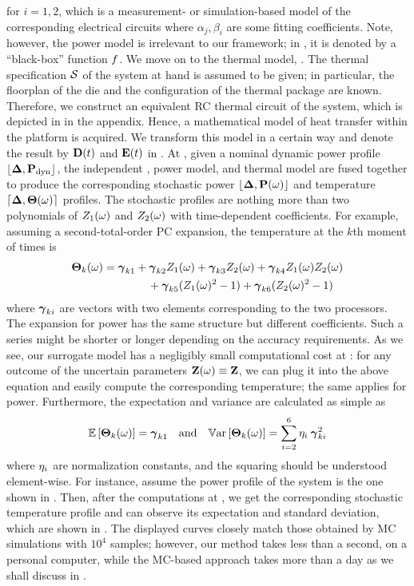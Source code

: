 for $i = 1, 2$, which is a measurement- or simulation-based model of the corresponding electrical circuits where $\alpha_j, \beta_i$ are some fitting coefficients. Note, however, the power model is irrelevant to our framework; in , it is denoted by a ``black-box'' function $f$. We move on to the thermal model, . The thermal specification $\mathcal{S}$ of the system at hand is assumed to be given; in particular, the floorplan of the die and the configuration of the thermal package are known. Therefore, we construct an equivalent RC thermal circuit of the system, which is depicted in  in the appendix. Hence, a mathematical model of heat transfer within the platform is acquired. We transform this model in a certain way and denote the result by $\mCF(\t)$ and $\mCS(\t)$ in . At , given a nominal dynamic power profile $\profPdyn$, the independent \rvs, power model, and thermal model are fused together to produce the corresponding stochastic power $\profP{\o}$ and temperature $\profT{\o}$ profiles. The stochastic profiles are nothing more than two polynomials of $Z_1(\omega)$ and $Z_2(\omega)$ with time-dependent coefficients. For example, assuming a second-total-order PC expansion, the temperature at the $k$th moment of times is
\begin{align*}
  {\boldsymbol\Theta}_k(\omega) &= {\boldsymbol\gamma}_{k1} + {\boldsymbol\gamma}_{k2} Z_1(\omega) + {\boldsymbol\gamma}_{k3} Z_2(\omega) + {\boldsymbol\gamma}_{k4} Z_1(\omega) Z_2(\omega) \\
  & \qquad \qquad {} + {\boldsymbol\gamma}_{k5} (Z_1(\omega)^2 - 1) + {\boldsymbol\gamma}_{k6} (Z_2(\omega)^2 - 1)
\end{align*}
where ${\boldsymbol\gamma}_{ki}$ are vectors with two elements corresponding to the two processors. The expansion for power has the same structure but different coefficients. Such a series might be shorter or longer depending on the accuracy requirements. As we see, our surrogate model has a negligibly small computational cost at : for any outcome of the uncertain parameters $\mathbf{Z}(\omega) \equiv \mathbf{Z}$, we can plug it into the above equation and easily compute the corresponding temperature; the same applies for power. Furthermore, the expectation and variance are calculated as simple as
\[
  \mathbb{E}\left[{\boldsymbol\Theta}_k(\omega)\right] = {\boldsymbol\gamma}_{k1} \hspace{1em} \text{and} \hspace{1em} \mathbb{V}\text{ar}\left[{\boldsymbol\Theta}_k(\omega)\right] = \sum_{i = 2}^{6} \eta_i \: {\boldsymbol\gamma}_{ki}^2
\]
where $\eta_i$ are normalization constants, and the squaring should be understood element-wise. For instance, assume the power profile of the system is the one shown in . Then, after the computations at , we get the corresponding stochastic temperature profile and can observe its expectation and standard deviation, which are shown in . The displayed curves closely match those obtained by MC simulations with $10^4$ samples; however, our method takes less than a second, on a personal computer, while the MC-based approach takes more than a day as we shall discuss in .
